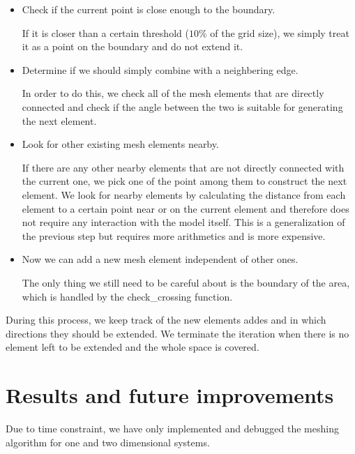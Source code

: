 \documentclass[10pt,fleqn]{article}
\begin{document}
\begin{itemize}
\item Check if the current point is close enough to the boundary.

  If it is closer than a certain threshold ($10\%$ of the grid size), we
  simply treat it as a point on the boundary and do not extend it.

\item Determine if we should simply combine with a neighbering edge.

  In order to do this, we check all of the mesh elements that are directly
  connected and check if the angle between the two is suitable for generating
  the next element.

\item Look for other existing mesh elements nearby.

  If there are any other nearby elements that are not directly connected with
  the current one, we pick one of the point among them to construct the next
  element. We look for nearby elements by calculating the distance from each
  element to a certain point near or on the current element and therefore
  does not require any interaction with the model itself. This is a
  generalization of the previous step but requires more arithmetics and is
  more expensive.

\item Now we can add a new mesh element independent of other ones.

  The only thing we still need to be careful about is the boundary of the
  area, which is handled by the check\_crossing function.
\end{itemize}

During this process, we keep track of the new elements addes and in which
directions they should be extended. We terminate the iteration when there is
no element left to be extended and the whole space is covered.

\section{Results and future improvements}

Due to time constraint, we have only implemented and debugged the meshing
algorithm for one and two dimensional systems.

\end{document}
